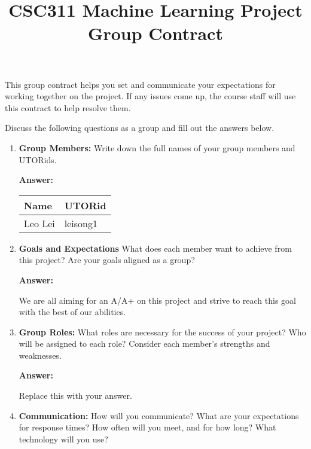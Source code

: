 \documentclass[12pt]{article}
\title{CSC311 Machine Learning Project Group Contract}
\author{}
\date{}
\newenvironment{answer}[1][]{
  \color{blue}\textbf{Answer:}
}{}
\begin{document}
\maketitle

This group contract helps you set and communicate your expectations for working together on the project. If any issues come up, the course staff will use this contract to help resolve them.

Discuss the following questions as a group and fill out the answers below.

\begin{enumerate}
\item {\bf Group Members:} Write down the full names of your group members and UTORids.

\begin{answer}

\begin{tabular}{|l|l|}
    \hline
    Name & UTORid \\
    \hline
    Leo Lei & leisong1 \\
    \hline
\end{tabular}

\end{answer}

\item {\bf Goals and Expectations} What does each member want to achieve from this project? Are your goals aligned as a group?

\begin{answer}

We are all aiming for an A/A+ on this project and strive to reach this goal with the best of our abilities. 

\end{answer}

\item {\bf Group Roles:} What roles are necessary for the success of your project? Who will be assigned to each role? Consider each member’s strengths and weaknesses.

\begin{answer}

Replace this with your answer.

\end{answer}

\item {\bf Communication:} How will you communicate? What are your expectations for response times? How often will you meet, and for how long? What technology will you use?


\end{enumerate}
\end{document}
